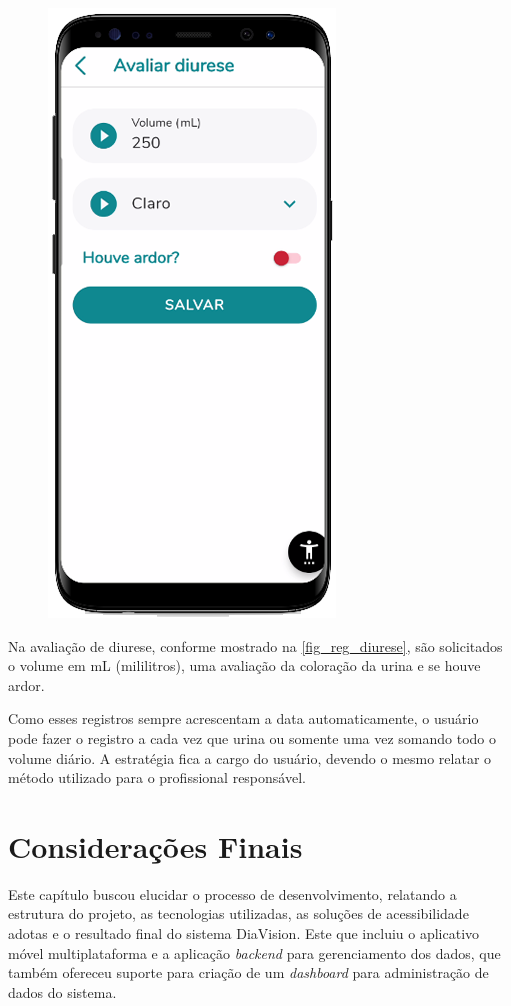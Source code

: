 \begin{figure}[htb]
\begin{minipage}{0.45\textwidth}
        \includegraphics[scale=0.66]{Imagens/desenvolvimento/app/reg_diurese.png}
    \end{minipage}
\end{figure}

Na avaliação de diurese, conforme mostrado na \autoref{fig_reg_diurese}, são solicitados o volume em mL
(mililitros), uma avaliação da coloração da urina e se houve ardor.

Como esses registros sempre acrescentam a data automaticamente, o usuário pode fazer o registro
a cada vez que urina ou somente uma vez somando todo o volume diário. A estratégia fica a cargo do usuário,
devendo o mesmo relatar o método utilizado para o profissional responsável.

\section{Considerações Finais}

Este capítulo buscou elucidar o processo de desenvolvimento, relatando a estrutura do projeto, as tecnologias
utilizadas, as soluções de acessibilidade adotas e o resultado final do sistema DiaVision. Este que incluiu o
aplicativo móvel multiplataforma e a aplicação \emph{backend} para gerenciamento dos dados, que também ofereceu
suporte para criação de um \emph{dashboard} para administração de dados do sistema.
